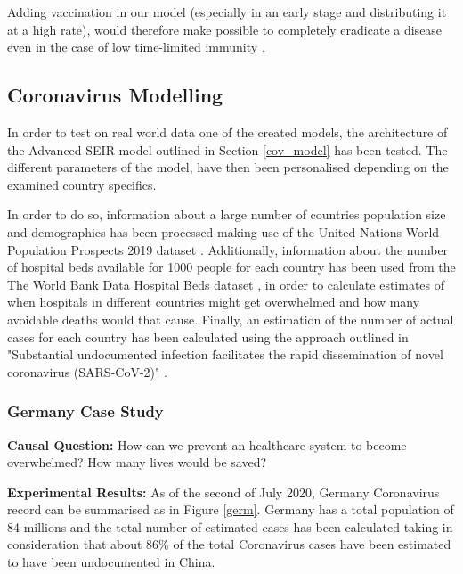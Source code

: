 Adding vaccination in our model (especially in an early stage and distributing it at a high rate), would therefore make possible to completely eradicate a disease even in the case of low time-limited immunity \cite{next}.

\subsection{Coronavirus Modelling}
In order to test on real world data one of the created models, the architecture of the Advanced SEIR model outlined in Section \ref{cov_model} has been tested. The different parameters of the model, have then been personalised depending on the examined country specifics.

In order to do so, information about a large number of countries population size and demographics has been processed making use of the United Nations World Population Prospects 2019 dataset \cite{pop_data}. Additionally, information about the number of hospital beds available for 1000 people for each country has been used from the The World Bank Data Hospital Beds dataset \cite{beds_data}, in order to calculate estimates of when hospitals in different countries might get overwhelmed and how many avoidable deaths would that cause. Finally, an estimation of the number of actual cases for each country has been calculated using the approach outlined in "Substantial undocumented infection facilitates the rapid dissemination of novel coronavirus (SARS-CoV-2)" \cite{cases_paper}.

\subsubsection{Germany Case Study}

\textbf{Causal Question:} How can we prevent an healthcare system to become overwhelmed? How many lives would be saved?

\textbf{Experimental Results:} As of the second of July 2020, Germany Coronavirus record can be summarised as in Figure \ref{germ}. Germany has a total population of 84 millions and the total number of estimated cases has been calculated taking in consideration that about 86\% of the total Coronavirus cases have been estimated to have been undocumented \cite{cases_paper} in China.

